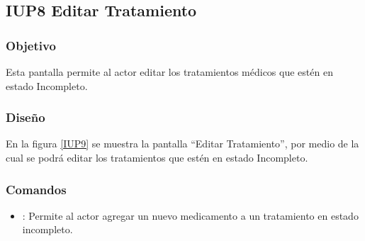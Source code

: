 \subsection{IUP8 Editar Tratamiento}
 
\subsubsection{Objetivo}

    Esta pantalla permite al actor editar los tratamientos médicos que estén en estado Incompleto.

\subsubsection{Diseño}

    En la figura \ref{IUP9} se muestra la pantalla ``Editar Tratamiento'', por medio de la cual se podrá editar los tratamientos que estén en estado Incompleto. \\
	\newpage

\subsubsection{Comandos}
\begin{itemize}
    \item {}: Permite al actor agregar un nuevo medicamento a un tratamiento en estado incompleto.
    
\end{itemize}

%
